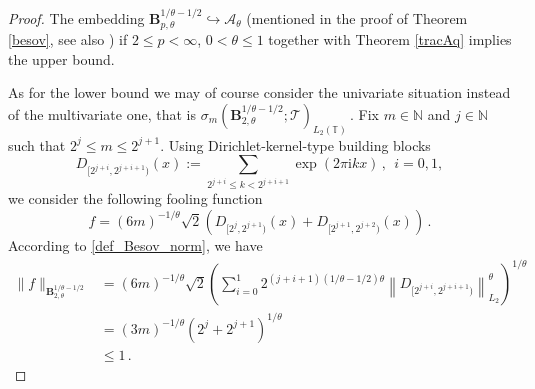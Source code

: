 \documentclass[11pt,reqno]{article}
\numberwithin{equation}{section}
\theoremstyle{definition}
\theoremstyle{plain}
\newcommand{\N}{\ensuremath{\mathbb{N}}}
\newcommand{\tor}{\ensuremath{\mathbb{T}}}
\newcommand{\ca}{\ensuremath{\mathcal A}}
\begin{document}
 \begin{proof} The embedding
$\mathbf{B}^{1/\theta-1/2}_{p,\theta} \hookrightarrow \ca_\theta$ (mentioned in the proof of Theorem \ref{besov}, see also \cite{MSU25}) if $2\leq p<\infty$, $0<\theta \leq 1$ together with Theorem \ref{tracAq} implies the upper bound. 



As for the lower bound we may of course consider the univariate situation instead of the multivariate one, that is $
\sigma_{m}(\mathbf{B}^{1/\theta-1/2}_{2,\theta};\mathcal{T})_{L_2(\tor)}\,.$ Fix $m\in \N$ and $j \in \N$ such that $2^j \leq m \leq 2^{j+1}$. Using Dirichlet-kernel-type building blocks \begin{equation}\label{Dirichlet_kernel_type_building_blocks}
D_{[2^{j+i},2^{j+i+1})} (x):= \sum\limits_{2^{j+i} \leq k < 2^{j+i+1}} \exp(2\pi \mathrm{i} kx)\,, \ \ i=0,1,   
 \end{equation} 
we consider the following fooling function
 $$
    f = (6m)^{-1/\theta} \sqrt{2} 
    \left(D_{[2^{j},2^{j+1})} (x) 
    + 
    D_{[2^{j+1},2^{j+2})} (x) \right) \, . 
 $$ 
 According to \eqref{def_Besov_norm}, we have
\begin{equation} 
    \begin{split} 
 \|f\|_{\mathbf{B}^{1/\theta-1/2}_{2,\theta}} & = (6m)^{-1/\theta} \sqrt{2} \left(\sum\limits_{i=0}^{1}2^{(j+i+1)(1/\theta-1/2)\theta} \left\|D_{[2^{j+i},2^{j+i+1})}\right\|_{L_{2}}^{\theta} \right)^{1/\theta}
 \\
 & = (3m)^{-1/\theta} ( 2^{j} + 2^{j+1} )^{1/\theta}
 \\
 & \leq 1 \, . 
    \end{split}
\end{equation}




\end{proof}
\end{document}
